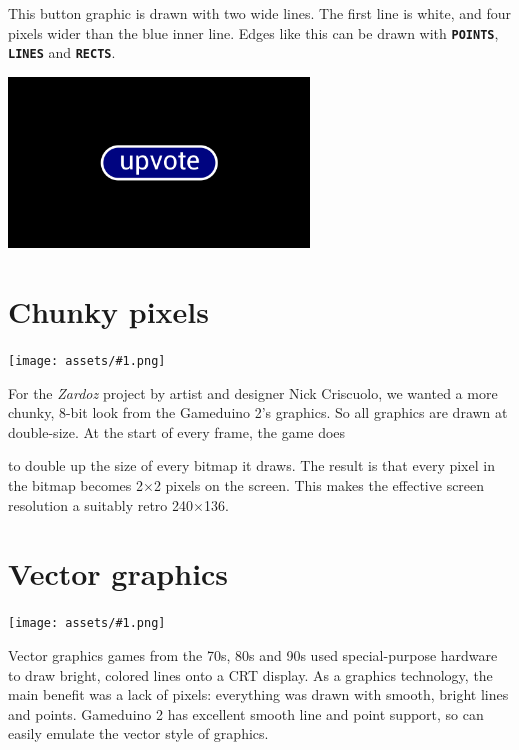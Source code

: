 \documentclass[10pt]{book}
\makeatletter
\newcommand{\gdtwo}{Gameduino 2 }
\newcommand{\png}[1]{
\begin{center}
\texttt{[image: assets/\#1.png]}
\end{center}
}
\newcommand{\mach}[1]{\texttt{\textbf{#1}}}
\newcommand{\cmdidx}[1]{
\index{#1@\mach{#1()}}
}
\makeatother
\begin{document}
\begin{CJK}{UTF8}{gkai}
This button graphic is drawn with two wide lines.
The first line is white, and four pixels wider than the blue inner line.
Edges like this can be drawn with
\mach{POINTS},
\mach{LINES} and
\mach{RECTS}.

\begin{center}
\includegraphics[width=0.6\textwidth,trim=120 100 120 100,clip=true]{assets/0057.png}
\end{center}

\newpage
\section{Chunky pixels}
\cmdidx{cmd\_scale}

\png{zardoz}

For the \textit{Zardoz} project by artist and designer Nick Criscuolo, we wanted a
more chunky, 8-bit look from the Gameduino 2's graphics.
So all graphics are drawn at double-size.
At the start of every frame, the game does


\noindent
to double up the size of every bitmap it draws.
The result is that every pixel in the bitmap becomes 2$\times$2 pixels
on the screen.
This makes the effective screen resolution a suitably retro 240$\times$136.

\newpage
\section{Vector graphics}

\png{vector}

Vector graphics games from the 70s, 80s and 90s used special-purpose hardware
to draw bright, colored lines onto a CRT display.
As a graphics technology, the main benefit was a lack of pixels: everything was drawn with
smooth, bright lines and points.
\gdtwo has excellent smooth line and point support, so can easily emulate the vector style of graphics.


\end{CJK}
\end{document}
